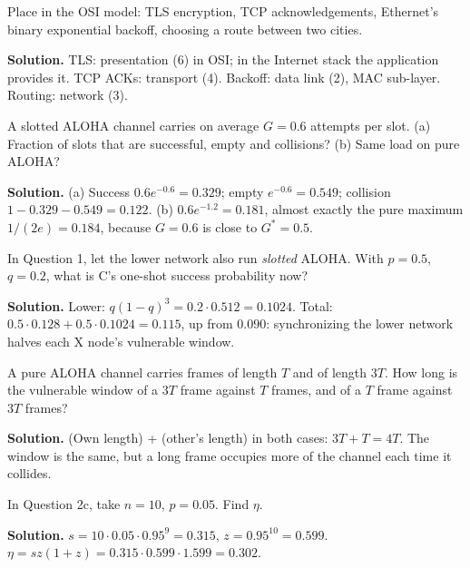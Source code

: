 \begin{example}
Place in the OSI model: TLS encryption, TCP acknowledgements, Ethernet's binary exponential backoff, choosing a route between two cities.

\textbf{Solution.} TLS: presentation (6) in OSI; in the Internet stack the application provides it. TCP ACKs: transport (4). Backoff: data link (2), MAC sub-layer. Routing: network (3).
\end{example}

\begin{example}
A slotted ALOHA channel carries on average $G = 0.6$ attempts per slot. (a) Fraction of slots that are successful, empty and collisions? (b) Same load on pure ALOHA?

\textbf{Solution.} (a) Success $0.6e^{-0.6} = 0.329$; empty $e^{-0.6} = 0.549$; collision $1-0.329-0.549 = 0.122$. (b) $0.6e^{-1.2} = 0.181$, almost exactly the pure maximum $1/(2e)=0.184$, because $G=0.6$ is close to $G^*=0.5$.
\end{example}

\begin{example}
In Question 1, let the lower network also run \emph{slotted} ALOHA. With $p=0.5$, $q=0.2$, what is C's one-shot success probability now?

\textbf{Solution.} Lower: $q(1-q)^3 = 0.2\cdot0.512 = 0.1024$. Total: $0.5\cdot0.128 + 0.5\cdot0.1024 = 0.115$, up from $0.090$: synchronizing the lower network halves each X node's vulnerable window.
\end{example}

\begin{example}
A pure ALOHA channel carries frames of length $T$ and of length $3T$. How long is the vulnerable window of a $3T$ frame against $T$ frames, and of a $T$ frame against $3T$ frames?

\textbf{Solution.} (Own length) + (other's length) in both cases: $3T + T = 4T$. The window is the same, but a long frame occupies more of the channel each time it collides.
\end{example}

\begin{example}
In Question 2c, take $n = 10$, $p = 0.05$. Find $\eta$.

\textbf{Solution.} $s = 10\cdot0.05\cdot0.95^9 = 0.315$, $z = 0.95^{10} = 0.599$. $\eta = sz(1+z) = 0.315\cdot0.599\cdot1.599 = 0.302$.
\end{example}

